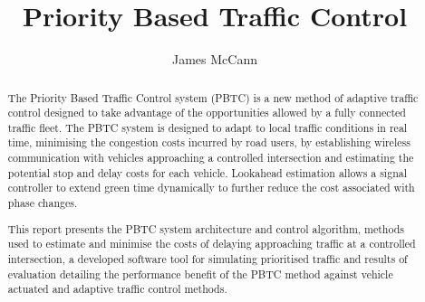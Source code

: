 \documentclass[11pt, a4paper, twoside, openright]{report}
\title{Priority Based Traffic Control}
\author{James McCann}
\date{}
\begin{document}
\frontmatter

\begin{abstract}

The Priority Based Traffic Control system (PBTC) is a new method of adaptive traffic control designed to take advantage of the opportunities allowed by a fully connected traffic fleet. The PBTC system is designed to adapt to local traffic conditions in real time, minimising the congestion costs incurred by road users, by establishing wireless communication with vehicles approaching a controlled intersection and estimating the potential stop and delay costs for each vehicle. Lookahead estimation allows a signal controller to extend green time dynamically to further reduce the cost associated with phase changes. 

This report presents the PBTC system architecture and control algorithm, methods used to estimate and minimise the costs of delaying approaching traffic at a controlled intersection, a developed software tool for simulating prioritised traffic and results of evaluation detailing the performance benefit of the PBTC method against vehicle actuated and adaptive traffic control methods.
  
\end{abstract}

\maketitle

\tableofcontents


\mainmatter








\backmatter

%





\end{document}
